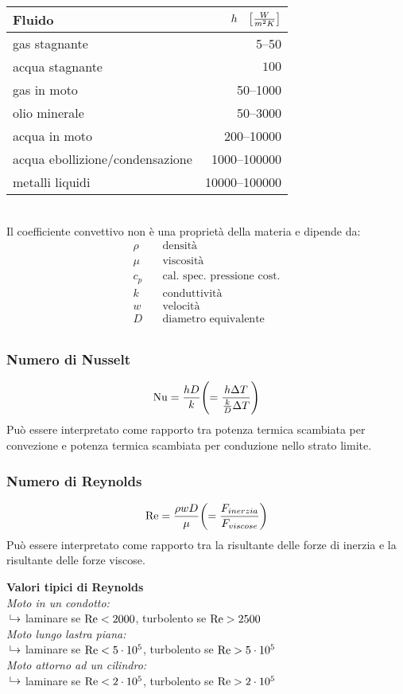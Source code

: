 \begin{tabular}{p{5cm}r}
    \toprule
    Fluido & $h \quad \qty[\frac{W}{m^2K}]$ \\ \midrule
    gas stagnante &  \numrange{5}{50} \\
    acqua stagnante & $100$ \\
    gas in moto & \numrange{50}{1000} \\
    olio minerale & \numrange{50}{3000} \\
    acqua in moto & \numrange{200}{10000} \\
    acqua ebollizione/condensazione & \numrange{1000}{100000} \\
    metalli liquidi & \numrange{10000}{100000} \\
    \bottomrule
\end{tabular}\\

Il coefficiente convettivo non è una proprietà della materia e dipende da:
\begin{align*}
    \rho & \quad \text{densità} \\
    \mu & \quad \text{viscosità} \\
    c_p & \quad \text{cal. spec. pressione cost.} \\
    k & \quad \text{conduttività} \\
    w & \quad \text{velocità} \\
    D & \quad \text{diametro equivalente} \\
\end{align*}


\subsubsection{Numero di Nusselt}
\[ \operatorname{Nu} = \frac{h D}{k} \qty( = \frac{h \Delta T}{\frac{k}{D} \Delta T})\] 
Può essere interpretato come rapporto tra potenza termica scambiata per convezione e potenza termica scambiata per conduzione nello strato limite.

\subsubsection{Numero di Reynolds}
\[ \operatorname{Re} = \frac{\rho w D}{\mu} \qty( = \frac{F_{inerzia}}{F_{viscose}})\] 
Può essere interpretato come rapporto tra la risultante delle forze di inerzia e la risultante delle forze viscose.

\textbf{Valori tipici di Reynolds}\\
\textit{Moto in un condotto:}\\
\phantom{→}$\put(3,2){\line(0,1){5}}\to$ laminare se $\operatorname{Re} < 2000$, turbolento se $\operatorname{Re} > 2500$\\
\textit{Moto lungo lastra piana:}\\
\phantom{→}$\put(3,2){\line(0,1){5}}\to$ laminare se $\operatorname{Re} < 5 \cdot 10^5$, turbolento se $\operatorname{Re} > 5 \cdot 10^5$\\
\textit{Moto attorno ad un cilindro:}\\
\phantom{→}$\put(3,2){\line(0,1){5}}\to$ laminare se $\operatorname{Re} < 2 \cdot 10^5$, turbolento se $\operatorname{Re} > 2 \cdot 10^5$\\


